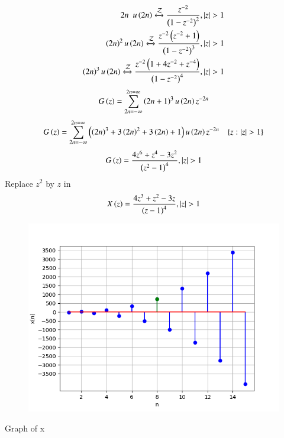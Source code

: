 \documentclass[beamer]{IEEEtran}
\theoremstyle{remark}
\begin{document}
\begin{align}
	{2n} \hspace{5pt} u\left(2n\right) \xleftrightarrow{\mathcal{Z}} \frac{z^{-2}}{\left(1-z^{-2}\right)^2},\left\vert z\right\vert >1 \\
    \left(2n\right)^2  u\left(2n\right) \xleftrightarrow{\mathcal{Z}} \frac{z^{-2}\left(z^{-2}+1\right)}{\left(1-z^{-2}\right)^3},\left\vert z\right\vert > 1 \\
	\left(2n\right)^3 u\left(2n\right) \xleftrightarrow{\mathcal{Z}}  \frac{z^{-2}\left(1+4z^{-2}+z^{-4}\right)}{\left(1-z^{-2}\right)^4},\left\vert z\right\vert >1 \\
\end{align}
\begin{align}
	G\left(z\right)=\sum_{2n=-\infty}^{2n=\infty}\left(2n+1\right)^{3}u\left(2n\right)z^{-2n}
\end{align}
\begin{align}
	G\brak{z}=\sum_{2n=-\infty}^{2n=\infty}\brak{\brak{2n}^3+3\brak{2n}^2+3\brak{2n}+1}u\brak{2n}z^{-2n}\hspace{10pt}
\{z:|z|>1\}
\end{align} 
\begin{align}
	G\left(z\right)=\frac{4z^6+z^4-3z^2}{\left(z^2-1\right)^4}, \left\vert z\right\vert>1 
\end{align}
Replace $z^2$ by $z$ in 
\begin{align}
	X\left(z\right)=\frac{4z^3+z^2-3z}{\left(z-1\right)^4} , \left\vert z\right\vert>1
\end{align}

\begin{figure}[h]
    \centering
    \includegraphics[width=1 \columnwidth]{figs/graph.png} 
    \label{fig:11.9.1.9.1}
\end{figure}
\begin{center}
Graph of x
   \end{center}
\end{document}
